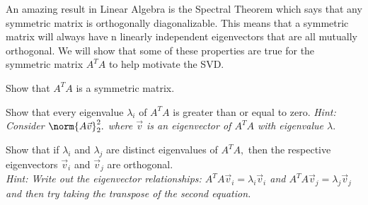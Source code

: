 


An amazing result in Linear Algebra is the Spectral Theorem which says that any symmetric matrix is orthogonally diagonalizable.
This means that a symmetric matrix will always have n linearly independent eigenvectors that are all mutually orthogonal.
We will show that some of these properties are true for the symmetric matrix $A^{T}A$ to help motivate the SVD.

\begin{enumerate}
  \qitem Show that $A^{T}A$ is a symmetric matrix.

  \ws{
  \vspace{150px}
  }


  \qitem Show that every eigenvalue $\lambda_{i}$ of $A^{T}A$ is greater than or equal to zero. \vskip 1pt
  \textit{Hint: Consider $\norm{A\vec{v}}_{2}^{2}.$ where $\vec{v}$ is an eigenvector of $A^{T}A$ with eigenvalue $\lambda.$}

  \ws{
  \vspace{150px}
  }


  \qitem Show that if $\lambda_{i}$ and $\lambda_{j}$ are distinct eigenvalues of $A^{T} A,$ then the respective eigenvectors $\vec{v}_{i}$ and $\vec{v}_{j}$ are orthogonal. \\
  \textit{Hint: Write out the eigenvector relationships: $A^{T} A \vec{v}_{i} = \lambda_{i} \vec{v}_{i}$ and $A^{T} A \vec{v}_{j} = \lambda_{j} \vec{v}_{j}$ and then try taking the transpose of the second equation.}


\end{enumerate}
